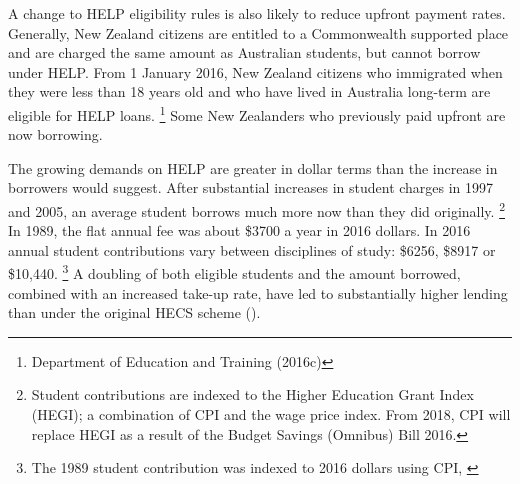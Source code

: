 \documentclass[embargoed]{grattan}
\begin{document}
A change to \gls{HELP} eligibility rules is also likely to reduce upfront payment rates.
Generally, New Zealand citizens are entitled to a Commonwealth supported place and are charged the same amount as Australian students, but cannot borrow under \gls{HELP}.
From 1 January 2016, New Zealand citizens who immigrated when they were less than 18 years old and who have lived in Australia long-term are eligible for \gls{HELP} loans.%
\footnote{Department of Education and Training (2016c)} Some New Zealanders who previously paid upfront are now borrowing.

The growing demands on \gls{HELP} are greater in dollar terms than the increase in borrowers would suggest.
After substantial increases in student charges in 1997 and 2005, an average student borrows much more now than they did originally.%
\footnote{Student contributions are indexed to the Higher Education Grant Index (HEGI); a combination of \gls{CPI} and the wage price index.
From 2018, \gls{CPI} will replace HEGI as a result of the Budget Savings (Omnibus) Bill 2016.} In 1989, the flat annual fee was about \$3700 a year in 2016 dollars.
In 2016 annual student contributions vary between disciplines of study: \$6256, \$8917 or \$10,440.%
\footnote{The 1989 student contribution was indexed to 2016 dollars using \gls{CPI}, \textcites{ABS2016LabourforceAustralia}[][1--8]{Government2016Budget201617}{Education2015DepartmentEducationTraining}} %
A doubling of both eligible students and the amount borrowed, combined with an increased take-up rate, have led to substantially higher lending than under the original \gls{HECS} scheme ().
\end{document}
